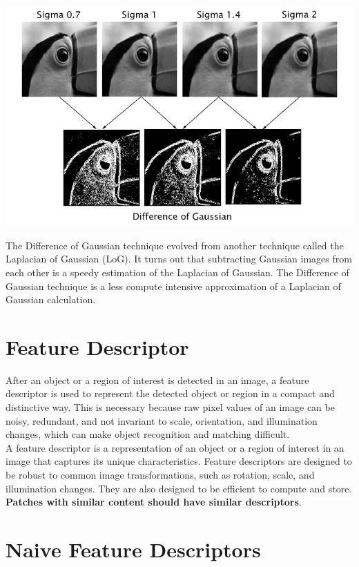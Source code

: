 \documentclass{article}
\begin{document}
\begin{center}
    \includegraphics[width=.9\linewidth]{images/dog.png}
\end{center}

The Difference of Gaussian technique evolved from another technique called the Laplacian of Gaussian (LoG). It turns out that subtracting Gaussian images from each other is a speedy estimation of the Laplacian of Gaussian. The Difference of Gaussian technique is a less compute intensive approximation of a Laplacian of Gaussian calculation.

\newpage

\section*{Feature Descriptor}

After an object or a region of interest is detected in an image, a feature descriptor is used to represent the detected object or region in a compact and distinctive way. This is necessary because raw pixel values of an image can be noisy, redundant, and not invariant to scale, orientation, and illumination changes, which can make object recognition and matching difficult. \\

A feature descriptor is a representation of an object or a region of interest in an image that captures its unique characteristics. Feature descriptors are designed to be robust to common image transformations, such as rotation, scale, and illumination changes. They are also designed to be efficient to compute and store. \\

\textbf{Patches with similar content should have similar descriptors}.

\section*{Naive Feature Descriptors}
\end{document}
